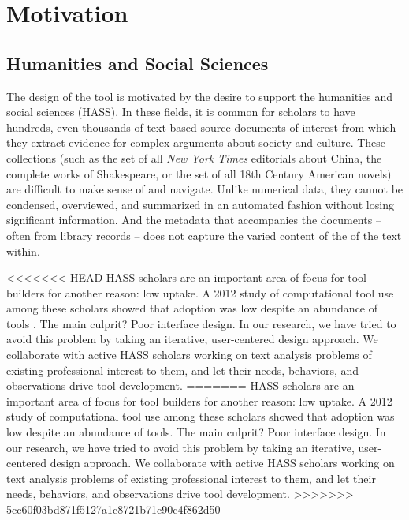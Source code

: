 \documentclass{sig-alternate}
\begin{document}
\section{Motivation}

\subsection{Humanities and Social Sciences}
The design of the tool is motivated by the desire to support the humanities and social sciences (HASS). In these fields, it is common for scholars to have hundreds, even thousands of text-based source documents of interest from which they extract evidence for complex arguments about society and culture. These collections (such as the set of all \emph{New York Times} editorials about China, the complete works of Shakespeare, or the set of all 18th Century American novels)  are difficult to make sense of and navigate. Unlike numerical data, they cannot be condensed, overviewed, and summarized in an automated fashion without losing significant information. And the metadata that accompanies the documents -- often from library records -- does not capture the varied content of the of the text within.

<<<<<<< HEAD
HASS scholars are an important area of focus for tool builders for another reason: low uptake. A 2012 study of computational tool use among these scholars showed that adoption was low despite an abundance of tools \cite{}. The main culprit? Poor interface design. In our research, we have tried to avoid this problem by taking an iterative, user-centered design approach. We collaborate with active HASS scholars working on text analysis problems of existing professional interest to them, and let their needs, behaviors, and observations drive tool development.
=======
HASS scholars are an important area of focus for tool builders for another reason: low uptake. A 2012 study \cite{gibbs_building_2012} of computational tool use among these scholars showed that adoption was low despite an abundance of tools. The main culprit? Poor interface design. In our research, we have tried to avoid this problem by taking an iterative, user-centered design approach. We collaborate with active HASS scholars working on text analysis problems of existing professional interest to them, and let their needs, behaviors, and observations drive tool development.
>>>>>>> 5cc60f03bd871f5127a1c8721b71c90c4f862d50
\end{document}
